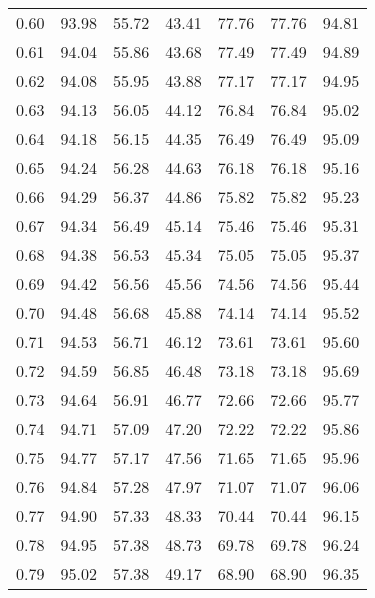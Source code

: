 \begin{tabular}{|c|c|c|c|c|c|c|}
      0.60 &     93.98 &     55.72 &      43.41 &   77.76 &      77.76 &         94.81 \\
      0.61 &     94.04 &     55.86 &      43.68 &   77.49 &      77.49 &         94.89 \\
      0.62 &     94.08 &     55.95 &      43.88 &   77.17 &      77.17 &         94.95 \\
      0.63 &     94.13 &     56.05 &      44.12 &   76.84 &      76.84 &         95.02 \\
      0.64 &     94.18 &     56.15 &      44.35 &   76.49 &      76.49 &         95.09 \\
      0.65 &     94.24 &     56.28 &      44.63 &   76.18 &      76.18 &         95.16 \\
      0.66 &     94.29 &     56.37 &      44.86 &   75.82 &      75.82 &         95.23 \\
      0.67 &     94.34 &     56.49 &      45.14 &   75.46 &      75.46 &         95.31 \\
      0.68 &     94.38 &     56.53 &      45.34 &   75.05 &      75.05 &         95.37 \\
      0.69 &     94.42 &     56.56 &      45.56 &   74.56 &      74.56 &         95.44 \\
      0.70 &     94.48 &     56.68 &      45.88 &   74.14 &      74.14 &         95.52 \\
      0.71 &     94.53 &     56.71 &      46.12 &   73.61 &      73.61 &         95.60 \\
      0.72 &     94.59 &     56.85 &      46.48 &   73.18 &      73.18 &         95.69 \\
      0.73 &     94.64 &     56.91 &      46.77 &   72.66 &      72.66 &         95.77 \\
      0.74 &     94.71 &     57.09 &      47.20 &   72.22 &      72.22 &         95.86 \\
      0.75 &     94.77 &     57.17 &      47.56 &   71.65 &      71.65 &         95.96 \\
      0.76 &     94.84 &     57.28 &      47.97 &   71.07 &      71.07 &         96.06 \\
      0.77 &     94.90 &     57.33 &      48.33 &   70.44 &      70.44 &         96.15 \\
      0.78 &     94.95 &     57.38 &      48.73 &   69.78 &      69.78 &         96.24 \\
      0.79 &     95.02 &     57.38 &      49.17 &   68.90 &      68.90 &         96.35 \\

\end{tabular}
